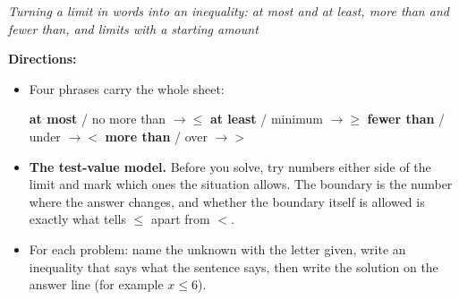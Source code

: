 \documentclass[12pt]{article}
\begin{document}

\begin{center}
\textit{Turning a limit in words into an inequality: at most and at least, more
than and fewer than, and limits with a starting amount}
\end{center}

\noindent\textbf{Directions:}
\begin{itemize}
  \item Four phrases carry the whole sheet:\par
        \textbf{at most} / no more than $\rightarrow \le$ \qquad
        \textbf{at least} / minimum $\rightarrow \ge$ \qquad
        \textbf{fewer than} / under $\rightarrow <$ \qquad
        \textbf{more than} / over $\rightarrow >$
  \item \textbf{The test-value model.} Before you solve, try numbers either side
        of the limit and mark which ones the situation allows. The boundary is
        the number where the answer changes, and whether the boundary itself is
        allowed is exactly what tells $\le$ apart from $<$.
  \item For each problem: name the unknown with the letter given, write an
        inequality that says what the sentence says, then write the solution on
        the answer line (for example $x \le 6$).
\end{itemize}


\end{document}
